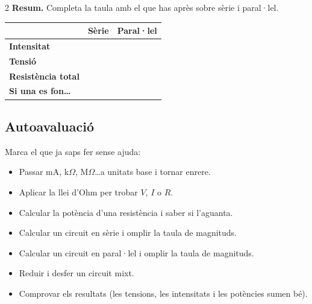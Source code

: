 \begin{exercici}{2}
\textbf{Resum.} Completa la taula amb el que has après sobre sèrie i paral·lel.
\begin{center}
\renewcommand{\arraystretch}{2.2}
\begin{tabular}{@{}l>{\centering\arraybackslash}p{5.5cm}>{\centering\arraybackslash}p{5.5cm}@{}}
\toprule
 & \textbf{Sèrie} & \textbf{Paral·lel}\\
\midrule
\textbf{Intensitat} & & \\
\textbf{Tensió} & & \\
\textbf{Resistència total} & & \\
\textbf{Si una es fon\ldots} & & \\
\bottomrule
\end{tabular}
\end{center}
\end{exercici}

\subsection*{Autoavaluació}

Marca el que ja saps fer sense ajuda:

\begin{itemize}[label=$\square$, itemsep=0.4em]
 \item Passar mA, k$\Omega$, M$\Omega$\ldots a unitats base i tornar enrere.
 \item Aplicar la llei d'Ohm per trobar $V$, $I$ o $R$.
 \item Calcular la potència d'una resistència i saber si l'aguanta.
 \item Calcular un circuit en sèrie i omplir la taula de magnituds.
 \item Calcular un circuit en paral·lel i omplir la taula de magnituds.
 \item Reduir i desfer un circuit mixt.
 \item Comprovar els resultats (les tensions, les intensitats i les potències sumen bé).
\end{itemize}
